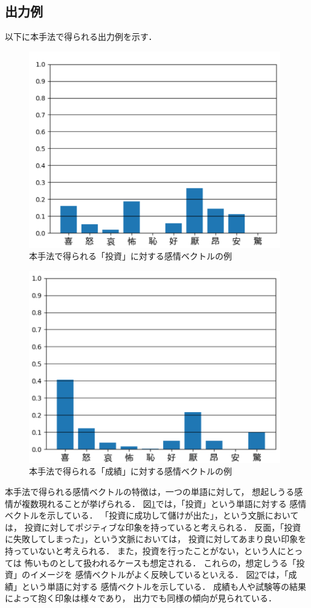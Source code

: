 	\subsection{出力例}
		以下に本手法で得られる出力例を示す．

		\begin{figure}[H]
			\centering
			\includegraphics[width=110mm]{./figure/takeuchi_output_toushi.png}
			\caption{本手法で得られる「投資」に対する感情ベクトルの例}
			\label{fig:takeuchi_output_1}
		\end{figure}

		\begin{figure}[H]
			\centering
			\includegraphics[width=110mm]{./figure/takeuchi_output_seiseki.png}
			\caption{本手法で得られる「成績」に対する感情ベクトルの例}
			\label{fig:takeuchi_output_2}
		\end{figure}

		本手法で得られる感情ベクトルの特徴は，一つの単語に対して，
		想起しうる感情が複数現れることが挙げられる．
		図\ref{fig:takeuchi_output_1}では，「投資」という単語に対する
		感情ベクトルを示している．
		「投資に成功して儲けが出た」，という文脈においては，
		投資に対してポジティブな印象を持っていると考えられる．
		反面，「投資に失敗してしまった」，という文脈においては，
		投資に対してあまり良い印象を持っていないと考えられる．
		また，投資を行ったことがない，という人にとっては
		怖いものとして扱われるケースも想定される．
		これらの，想定しうる「投資」のイメージを
		感情ベクトルがよく反映しているといえる．
		図\ref{fig:takeuchi_output_2}では，「成績」という単語に対する
		感情ベクトルを示している．
		成績も人や試験等の結果によって抱く印象は様々であり，
		出力でも同様の傾向が見られている．

